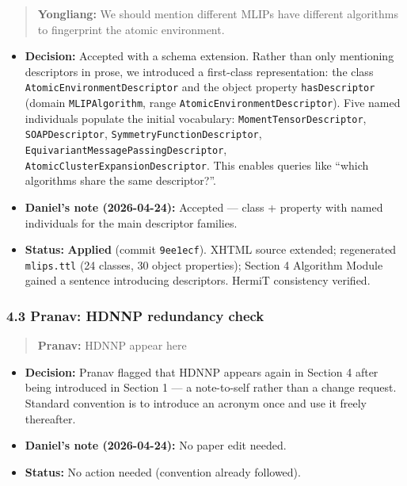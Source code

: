\begin{quote}
\textbf{Yongliang:} We should mention different MLIPs have different algorithms to fingerprint the atomic environment.
\end{quote}

\begin{itemize}
\tightlist
\item
  \textbf{Decision:} Accepted with a schema extension. Rather than only mentioning descriptors in prose, we introduced a first-class representation: the class \texttt{AtomicEnvironmentDescriptor} and the object property \texttt{hasDescriptor} (domain \texttt{MLIPAlgorithm}, range \texttt{AtomicEnvironmentDescriptor}). Five named individuals populate the initial vocabulary: \texttt{MomentTensorDescriptor}, \texttt{SOAPDescriptor}, \texttt{SymmetryFunctionDescriptor}, \texttt{EquivariantMessagePassingDescriptor}, \texttt{AtomicClusterExpansionDescriptor}. This enables queries like ``which algorithms share the same descriptor?''.
\item
  \textbf{Daniel's note (2026-04-24):} Accepted --- class + property with named individuals for the main descriptor families.
\item
  \textbf{Status:} {\color{green!60!black}\faCheckCircle} \textbf{Applied} (commit \texttt{9ee1ecf}). XHTML source extended; regenerated \texttt{mlips.ttl} (24 classes, 30 object properties); Section 4 Algorithm Module gained a sentence introducing descriptors. HermiT consistency verified.
\end{itemize}

\subsubsection{4.3 Pranav: HDNNP redundancy check}\label{pranav-hdnnp-redundancy-check}

\begin{quote}
\textbf{Pranav:} HDNNP appear here
\end{quote}

\begin{itemize}
\tightlist
\item
  \textbf{Decision:} Pranav flagged that HDNNP appears again in Section 4 after being introduced in Section 1 --- a note-to-self rather than a change request. Standard convention is to introduce an acronym once and use it freely thereafter.
\item
  \textbf{Daniel's note (2026-04-24):} No paper edit needed.
\item
  \textbf{Status:} {\color{green!60!black}\faCheckCircle} No action needed (convention already followed).
\end{itemize}

